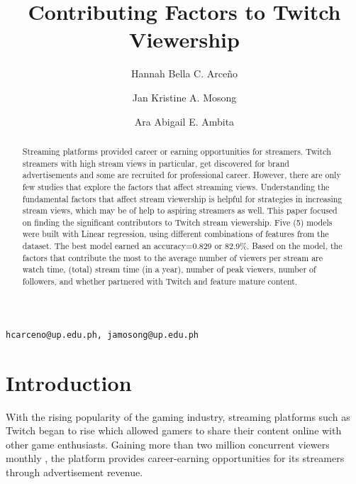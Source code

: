 \documentclass[runningheads]{llncs}
\begin{document}
%
\title{Contributing Factors to Twitch Viewership}
%
\author{Hannah Bella C. Arceño \and Jan Kristine A. Mosong \and Ara Abigail E. Ambita}
{\tt{hcarceno@up.edu.ph, jamosong@up.edu.ph}}
%

%

%
\maketitle
%
\begin{abstract}
    Streaming platforms provided career or earning opportunities for streamers. Twitch streamers with high stream views in particular, get discovered for brand advertisements and some are recruited for professional career. However, there are only few studies that explore the factors that affect streaming views. Understanding the fundamental factors that affect stream viewership is helpful for strategies in increasing stream views, which may be of help to aspiring streamers as well. This paper focused on finding the significant contributors to Twitch stream viewership. Five (5) models were built with Linear regression, using different combinations of features from the dataset. The best model earned an accuracy=0.829 or 82.9\%. Based on the model, the factors that contribute the most to the average number of viewers per stream are watch time, (total) stream time (in a year), number of peak viewers, number of followers, and whether partnered with Twitch and feature mature content. \\
\end{abstract}
%
%
\section{Introduction}
With the rising popularity of the gaming industry, streaming platforms such as Twitch began to rise which allowed gamers to share their content online with other game enthusiasts. Gaining more than two million concurrent viewers monthly \cite{twitchtracker}, the platform provides career-earning opportunities for its streamers through advertisement revenue. \\
\end{document}
